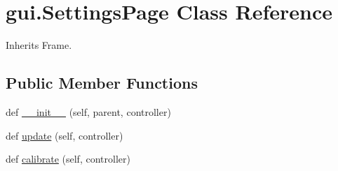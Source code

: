 \hypertarget{classgui_1_1_settings_page}{}\section{gui.\+Settings\+Page Class Reference}
\label{classgui_1_1_settings_page}


Inherits Frame.

\subsection*{Public Member Functions}
\begin{DoxyCompactItemize}
\item 
def \mbox{\hyperlink{classgui_1_1_settings_page_a83cb55146a85b6aa6a42326179e86c3e}{\+\_\+\+\_\+init\+\_\+\+\_\+}} (self, parent, controller)
\item 
def \mbox{\hyperlink{classgui_1_1_settings_page_ac2445b28977183112566153e4040ea09}{update}} (self, controller)
\item 
def \mbox{\hyperlink{classgui_1_1_settings_page_acf80cd46922483e88c69a77df3a0d4c2}{calibrate}} (self, controller)
\end{DoxyCompactItemize}
